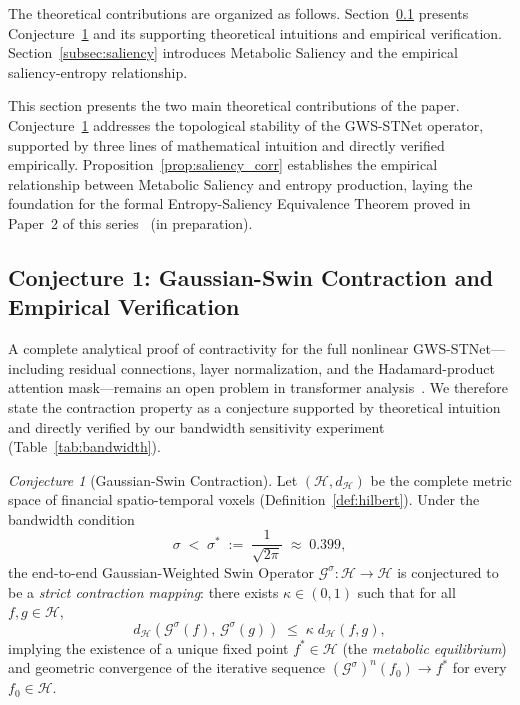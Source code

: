 \documentclass[11pt,a4paper]{article}  %
\newcommand{\Hilbert}{\mathcal{H}}
\newcommand{\Gop}{\mathcal{G}^{\sigma}}
\theoremstyle{plain}
\theoremstyle{definition}
\theoremstyle{remark}
\newtheorem{conjecture}{Conjecture}[section]
\begin{document}
The theoretical contributions are organized as follows.
Section~\ref{subsec:thm1} presents Conjecture~\ref{conj:contraction}
and its supporting theoretical intuitions and empirical verification.
Section~\ref{subsec:saliency} introduces Metabolic Saliency and the
empirical saliency-entropy relationship.

This section presents the two main theoretical contributions of
the paper. Conjecture~\ref{conj:contraction} addresses the
topological stability of the GWS-STNet operator, supported by
three lines of mathematical intuition and directly verified
empirically. Proposition~\ref{prop:saliency_corr} establishes
the empirical relationship between Metabolic Saliency and
entropy production, laying the foundation for the formal
Entropy-Saliency Equivalence Theorem proved in Paper~2
of this series~\cite{Moroke2026b} (in preparation).

\subsection{Conjecture 1: Gaussian-Swin Contraction and Empirical Verification}
\label{subsec:thm1}

A complete analytical proof of contractivity for the full nonlinear
GWS-STNet---including residual connections, layer normalization, and
the Hadamard-product attention mask---remains an open problem in
transformer analysis~\cite{Vuckovic2020}. We therefore state the
contraction property as a conjecture supported by theoretical
intuition and directly verified by our bandwidth sensitivity
experiment (Table~\ref{tab:bandwidth}).

\begin{conjecture}[Gaussian-Swin Contraction]
\label{conj:contraction}
Let $(\Hilbert, d_{\Hilbert})$ be the complete metric space of
financial spatio-temporal voxels (Definition~\ref{def:hilbert}).
Under the bandwidth condition
\begin{equation}
   \sigma \;<\; \sigma^* \;:=\; \frac{1}{\sqrt{2\pi}} \;\approx\; 0.399,
   \label{eq:bandwidthcond}
\end{equation}
the end-to-end Gaussian-Weighted Swin Operator
$\Gop:\Hilbert\to\Hilbert$ is conjectured to be a
\emph{strict contraction mapping}: there exists $\kappa\in(0,1)$
such that for all $f,g\in\Hilbert$,
\[
   d_{\Hilbert}\!\left(\Gop(f),\,\Gop(g)\right)
   \;\leq\; \kappa\;d_{\Hilbert}(f,g),
\]
implying the existence of a unique fixed point $f^*\in\Hilbert$
(the \emph{metabolic equilibrium}) and geometric convergence of the
iterative sequence $(\Gop)^n(f_0) \to f^*$ for every $f_0\in\Hilbert$.
\end{conjecture}
\end{document}
